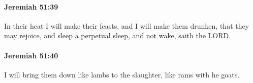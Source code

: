 		\paragraph{Jeremiah 51:39} %
			\label{JEREMIAH-51-39}

			In their heat I will make their feasts, and I will make them drunken, that they may rejoice, and sleep a perpetual sleep, and not wake, saith the LORD.


		\paragraph{Jeremiah 51:40} %
			\label{JEREMIAH-51-40}

			I will bring them down like lambs to the slaughter, like rams with he goats.


